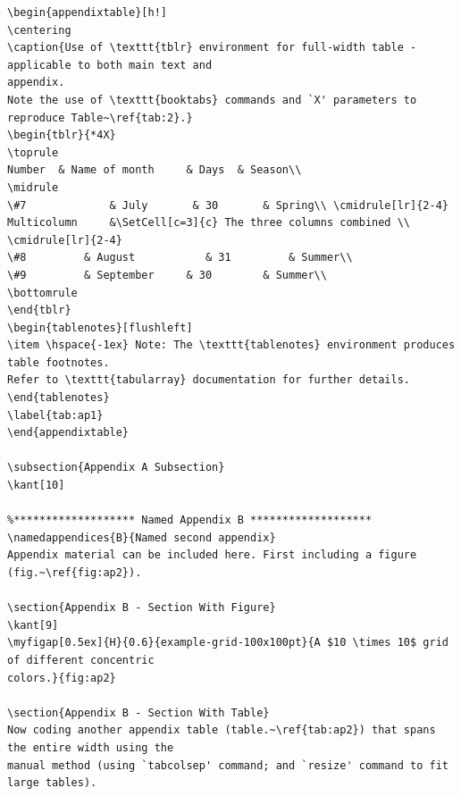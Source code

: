 \documentclass[letterpaper]{refart}
\begin{document}
{\begin{verbatim}
\begin{appendixtable}[h!]
\centering
\caption{Use of \texttt{tblr} environment for full-width table - applicable to both main text and 
appendix.  
Note the use of \texttt{booktabs} commands and `X' parameters to reproduce Table~\ref{tab:2}.}
\begin{tblr}{*4X}
\toprule
Number 	& Name of month 	& Days 	& Season\\
\midrule
\#7 			& July       & 30 		& Spring\\ \cmidrule[lr]{2-4}
Multicolumn 	&\SetCell[c=3]{c} The three columns combined \\ \cmidrule[lr]{2-4}
\#8 		& August 		   & 31 		& Summer\\
\#9 		& September 	& 30 		& Summer\\
\bottomrule
\end{tblr}
\begin{tablenotes}[flushleft]
\item \hspace{-1ex} Note: The \texttt{tablenotes} environment produces table footnotes.  
Refer to \texttt{tabularray} documentation for further details.  
\end{tablenotes}
\label{tab:ap1}
\end{appendixtable}

\subsection{Appendix A Subsection}
\kant[10]

%******************* Named Appendix B *******************
\namedappendices{B}{Named second appendix}
Appendix material can be included here. First including a figure (fig.~\ref{fig:ap2}).

\section{Appendix B - Section With Figure}
\kant[9]
\myfigap[0.5ex]{H}{0.6}{example-grid-100x100pt}{A $10 \times 10$ grid of different concentric 
colors.}{fig:ap2}

\section{Appendix B - Section With Table}
Now coding another appendix table (table.~\ref{tab:ap2}) that spans the entire width using the 
manual method (using `tabcolsep' command; and `resize' command to fit large tables).


\end{verbatim}}
\end{document}
